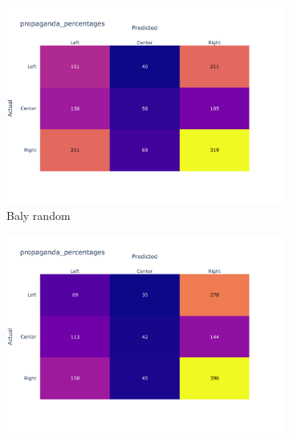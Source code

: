 \begin{figure}[!htb]
    \centering
     \begin{subfigure}[b]{0.48\linewidth}
         \centering
         \includegraphics[width=\linewidth]{figures/baly_random_confusion_matrix_propaganda_percentages-small.pdf}
         \caption{Baly random}
         \label{fig:prop_tech_confusion_baly_random}
     \end{subfigure}
    \begin{subfigure}[b]{0.48\linewidth}
         \centering 
         \includegraphics[width=\linewidth]{figures/baly_media_confusion_matrix_propaganda_percentages-small.pdf}

\end{subfigure}
\end{figure}
